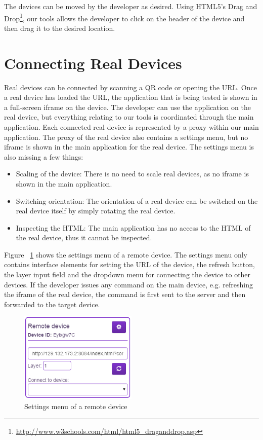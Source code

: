 The devices can be moved by the developer as desired. Using HTML5's Drag and Drop\footnote{\url{http://www.w3schools.com/html/html5_draganddrop.asp}}, our tools allows the developer to click on the header of the device and then drag it to the desired location. 

\section{Connecting Real Devices}

Real devices can be connected by scanning a QR code or opening the URL. Once a real device has loaded the URL, the application that is being tested is shown in a full-screen iframe on the device. The developer can use the application on the real device, but everything relating to our tools is coordinated through the main application. Each connected real device is represented by a proxy within our main application. The proxy of the real device also contains a settings menu, but no iframe is shown in the main application for the real device. The settings menu is also missing a few things:
\begin{itemize}
	\item Scaling of the device: There is no need to scale real devices, as no iframe is shown in the main application.
	\item Switching orientation: The orientation of a real device can be switched on the real device itself by simply rotating the real device.
	\item Inspecting the HTML: The main application has no access to the HTML of the real device, thus it cannot be inspected.
\end{itemize}
Figure ~\ref{fig:settings_menu_remote} shows the settings menu of a remote device. The settings menu only contains interface elements for setting the URL of the device, the refresh button, the layer input field and the dropdown menu for connecting the device to other devices. If the developer issues any command on the main device, e.g. refreshing the iframe of the real device, the command is first sent to the server and then forwarded to the target device. 

\begin{figure}[H]
  \centering
    \includegraphics[width=0.5\textwidth]{images/screenshots/remote_device.png}
	\caption{Settings menu of a remote device}
	\label{fig:settings_menu_remote}
\end{figure}

